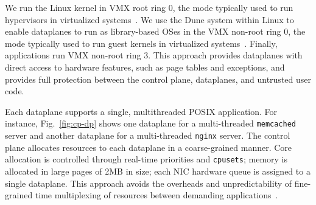 We run the Linux kernel in VMX root ring 0, the mode typically used to
run hypervisors in virtualized
systems~\cite{DBLP:journals/computer/UhligNRSMABKLS05}. We use the
Dune system within Linux to enable dataplanes to run as library-based
OSes in the VMX non-root ring 0, the mode typically used to run guest
kernels in virtualized systems~\cite{belay2012dune}. %
Finally, applications run VMX non-root ring 3. This
approach provides dataplanes with direct access to hardware features,
such as page tables and exceptions, and provides full protection
between the control plane, dataplanes, and untrusted user
code. %




Each \ix dataplane supports a single, multithreaded POSIX
application. For instance, Fig.~\ref{fig:cp-dp} shows one dataplane
for a multi-threaded \texttt{memcached} server and another dataplane
for a multi-threaded \texttt{nginx} server. The control plane allocates
resources to each dataplane in a coarse-grained manner. Core allocation
is controlled through real-time priorities and \texttt{cpusets};
memory is allocated in large pages of 2MB in size; each NIC hardware queue is
assigned to a single dataplane. This approach avoids the overheads and
unpredictability of fine-grained time multiplexing of resources between
demanding applications~\cite{Leverich:RHSU:2014}.


